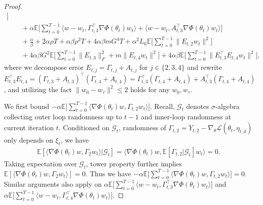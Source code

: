 \documentclass[twoside]{article} %
\theoremstyle{plain}
\theoremstyle{definition}
\theoremstyle{remark}
\newcommand{\fL}{\mathcal{L}}
\newcommand{\calG}{\mathcal{G}}
\begin{document}
\begin{proof}
\begin{align}
{    \big]} \nonumber\\
    &\quad +\alpha{\mathbb{E}\big[\sum_{t=0}^{T-1}\langle w -w_t, \Gamma_{t,3}^{\top}\nabla \Phi(\theta_t)w_t \rangle + \langle w -w_t, A_{t,3}^{\top}\nabla \Phi(\theta_t)w_t \rangle\big]} \nonumber\\
    &\quad +\frac{\alpha}{\beta}+ 2\alpha \rho T + \alpha\beta\rho^2T + 4\alpha\beta m G^4 T+\alpha^2 L_0 \mathbb{E}\big[ \sum_{t=0}^{T-1} \|E_{t,2}w_t\|^2\big] \nonumber\\
    &\quad +4\alpha\beta G^2 \mathbb{E}\big [\sum_{t=0}^{T-1} \|E_{t,3} \|_F^2+m\|{E}_{t,4}w_t\|^2 \big] + 4\alpha\beta \mathbb{E}\big[\sum_{t=0}^{T-1} \|E_{t,3}^{\top}E_{t,4}w_t\|^2 \big],
    \label{eq: intermediate descent inequality 2}
\end{align}
where we decompose error $E_{t,j}= \Gamma_{t,j}+A_{t,j}$ for $j\in\{2,3,4 \}$ and rewrite $E_{t,3}^{\top}E_{t,4}=(\Gamma_{t,3}+A_{t,3})^{\top}(\Gamma_{t,4}+A_{t,4})=\Gamma_{t,3}^{\top}(\Gamma_{t,4}+A_{t,4})+A_{t,3}^{\top}(\Gamma_{t,4}+A_{t,4})$, and utilizing the fact $\| w_0-w_{\tau}\|^2\leq 2$ holds for any $w_0, w_{\tau}$.

We first bound $-\alpha \mathbb{E}\big[\sum_{t=0}^{T-1}\langle \nabla \Phi(\theta_t)w, \Gamma_{t,2}w_t\rangle \big]$. 
Recall, $\calG_t$ denotes $\sigma$-algebra collecting outer loop randomness up to $t-1$ and inner-loop randomness at current iteration $t$. Conditioned on $\calG_t$, randomness of $\Gamma_{t,2} = Y_{t,2}-\nabla_{\theta}\fL(\theta_t,\eta_{t,d})$ only depends on $\xi_{t}$, we have
\begin{align}
    \mathbb{E}[\langle \nabla \Phi(\theta_t)w, \Gamma_{2}w_t\rangle|\calG_t] = \langle \nabla \Phi(\theta_t)w,  \mathbb{E}[\Gamma_{t,2}|\calG_t]w_t \rangle =0.
    \label{eq: inner product bound 1}
\end{align}
Taking expectation over $\calG_t$, tower property further implies $\mathbb{E}[\langle \nabla \Phi(\theta_t)w, \Gamma_{2}w_t\rangle]=0$. Thus we have $ -\alpha\mathbb{E}\big[\sum_{t=0}^{T-1}\langle \nabla \Phi(\theta_t)w, \Gamma_{t,2}w_t\rangle \big]=0$.
Similar arguments also apply on $\alpha\mathbb{E}\big[\sum_{t=0}^{T-1}\langle w -w_t, \Gamma_{t,3}^{\top}\nabla \Phi(\theta_t)w_t \rangle\big]$ and $\alpha\mathbb{E}\big[\sum_{t=0}^{T-1}\langle w -w_t, \Gamma_{t,4}^{\top}\nabla \Phi(\theta_t)w_t \rangle\big]$. 


\end{proof}
\end{document}

